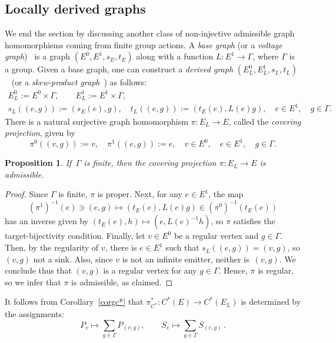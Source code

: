 \documentclass[12pt,times,a4paper]{amsart}
\newtheorem{proposition}[theorem]{Proposition}
\numberwithin{equation}{section}
\numberwithin{equation}{section}
\begin{document}
\subsection{Locally derived graphs}
We end the section by discussing another class of non-injective admissible graph homomorphisms coming from finite group actions. 
A {\em base  graph} (or a {\em  voltage graph})~\cite[\S 2.1]{gt-87} is a graph $(E^0,E^1,s_E,t_E)$ along with a function 
$L:E^1\to\Gamma$, where $\Gamma$ is a  group. Given a base graph, one can construct a {\em derived graph} 
$(E^0_L, E^1_L,s_L, t_L)$~\cite[\S 2.1.1]{gt-87} (or a {\em skew-product graph}~\cite[Definition 2.1]{kp-99}) as follows:
\begin{gather}
E_L^0:=E^0\times\Gamma,\qquad E_L^1:=E^1\times\Gamma,
\nonumber\\
s_L((e,g)):=(s_E(e),g),\quad t_L((e,g)):=(t_E(e),L(e)g),\quad e\in E^1,\quad g\in\Gamma.
\end{gather}
There is a natural surjective graph homomorphism 
$\pi:E_L\to E$, called the {\em covering projection}, given by
\begin{equation}\label{skewproj}
\pi^0((v,g)):=v,\quad \pi^1((e,g)):=e,\quad v\in E^0,\quad e\in E^1,\quad g\in\Gamma.
\end{equation}
\begin{proposition}\label{covadm}
If $\,\Gamma$ is finite, then the covering projection $\pi:E_L\to E$ is admissible.
\end{proposition}
\begin{proof}
Since $\Gamma$ is finite, $\pi$ is proper. Next, for any $e\in E^1$, the map
\begin{equation}
(\pi^1)^{-1}(e)\ni (e,g)\longmapsto (t_E(e),L(e)g)\in (\pi^0)^{-1}(t_E(e))
\end{equation}
has an inverse given by $(t_E(e),h)\mapsto (e,L(e)^{-1}h)$, so $\pi$ satisfies the target-bijectivity condition. 
Finally, let $v\in E^0$ be a regular vertex and $g\in\Gamma$. Then, by
 the regularity of $v$,
there is $e\in E^1$ such that $s_L((e,g))=(v,g)$, so $(v,g)$ not a sink. Also, since $v$ is not an infinite emitter, neither is~$(v,g)$. 
We conclude thus that $(v,g)$ is a regular vertex for any $g\in\Gamma$. Hence, $\pi$ is regular, so we infer  that
$\pi$ is admissible, as claimed.
\end{proof}

It follows from Corollary~\ref{corgc*} that $\pi^*_{C^*}\colon C^*(E)\to C^*(E_L)$ is determined by the assignments:
\begin{equation}
P_v\longmapsto \sum_{g\in\Gamma}P_{(v,g)},\qquad S_e\longmapsto \sum_{g\in\Gamma}S_{(e,g)}\,.
\end{equation}
\end{document}
